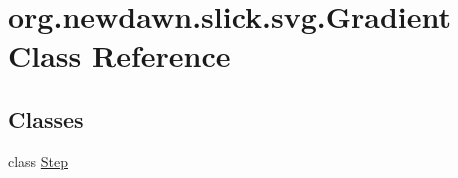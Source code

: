 \hypertarget{classorg_1_1newdawn_1_1slick_1_1svg_1_1_gradient}{}\section{org.\+newdawn.\+slick.\+svg.\+Gradient Class Reference}
\label{classorg_1_1newdawn_1_1slick_1_1svg_1_1_gradient}
\subsection*{Classes}
\begin{DoxyCompactItemize}
\item 
class \mbox{\hyperlink{classorg_1_1newdawn_1_1slick_1_1svg_1_1_gradient_1_1_step}{Step}}
\end{DoxyCompactItemize}
